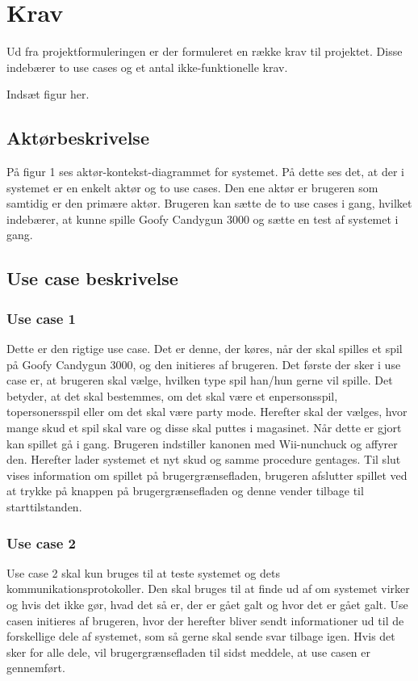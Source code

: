 \chapter{Krav}

Ud fra projektformuleringen er der formuleret en række krav til projektet. Disse indebærer to use cases og et antal ikke-funktionelle krav. 


Indsæt figur her. 

%


\section{Aktørbeskrivelse}
På figur 1 ses aktør-kontekst-diagrammet for systemet. På dette ses det, at der i systemet er en enkelt aktør og to use cases. Den ene aktør er brugeren som samtidig er den primære aktør. Brugeren kan sætte de to use cases i gang, hvilket indebærer, at kunne spille Goofy Candygun 3000 og sætte en test af systemet i gang. 

\section{Use case beskrivelse}
\subsection{Use case 1}
Dette er den rigtige use case. Det er denne, der køres, når der skal spilles et spil på Goofy Candygun 3000, og den initieres af brugeren. Det første der sker i use case er, at brugeren skal vælge, hvilken type spil han/hun gerne vil spille. Det betyder, at det skal bestemmes, om det skal være et enpersonsspil, topersonersspil eller om det skal være party mode. Herefter skal der vælges, hvor mange skud et spil skal vare og disse skal puttes i magasinet. Når dette er gjort kan spillet gå i gang. Brugeren indstiller kanonen med Wii-nunchuck og affyrer den. Herefter lader systemet et nyt skud og samme procedure gentages. Til slut vises information om spillet på brugergrænsefladen, brugeren afslutter spillet ved at trykke på knappen på brugergrænsefladen og denne vender tilbage til starttilstanden. 

\subsection{Use case 2}
Use case 2 skal kun bruges til at teste systemet og dets kommunikationsprotokoller. Den skal bruges til at finde ud af om systemet virker og hvis det ikke gør, hvad det så er, der er gået galt og hvor det er gået galt. Use casen initieres af brugeren, hvor der herefter bliver sendt informationer ud til de forskellige dele af systemet, som så gerne skal sende svar tilbage igen. Hvis det sker for alle dele, vil brugergrænsefladen til sidst meddele, at use casen er gennemført. 


